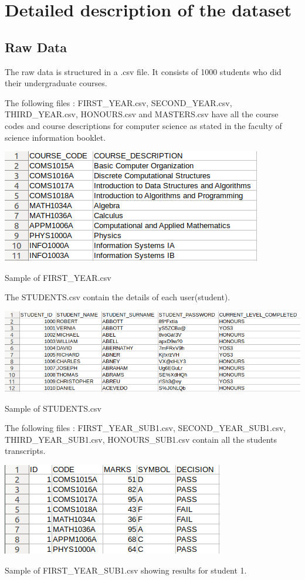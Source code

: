 \documentclass[10pt]{article}
\begin{document}
\newpage

\section{Detailed description of the dataset}

\subsection{Raw Data}
\begin{description}[font=$\bullet$~\normalfont\scshape\color{red!50!black}]
\item [] The raw data is structured in a .csv file. It consists of 1000 students who did their undergraduate courses.
\item [] The following files : FIRST\_YEAR.csv, SECOND\_YEAR.csv, THIRD\_YEAR.csv, HONOURS.csv and MASTERS.csv  have all the course codes and course descriptions for computer science as stated in the faculty of science information booklet.
\begin{center}
\includegraphics[width=.7\textwidth]{FIRST_YEAR.png}
\end{center}
\caption{Sample of FIRST\_YEAR.csv}

\item[] The STUDENTS.csv contain the details of each user(student).
\begin{center}
\includegraphics[width=.9\textwidth]{STUDENTS.png}
\end{center}
\caption{Sample of STUDENTS.csv}

\newpage

\item[] The following files : FIRST\_YEAR\_SUB1.csv, SECOND\_YEAR\_SUB1.csv, THIRD\_YEAR\_SUB1.csv, HONOURS\_SUB1.csv contain all the students transcripts. 
\begin{center}
\includegraphics[width=.7\textwidth]{results.png}
\end{center}
\caption{Sample of FIRST\_YEAR\_SUB1.csv showing results for student 1.}
\end{description}
\end{document}
